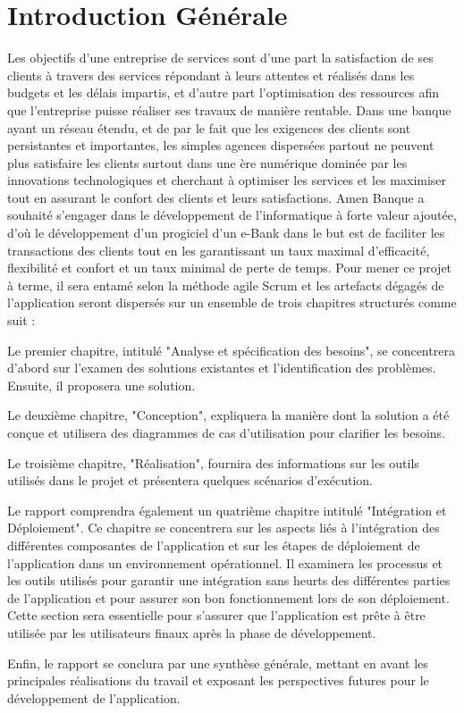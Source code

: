 \chapter*{Introduction Générale}

{\huge L}es objectifs d’une entreprise de services sont d’une part la satisfaction de ses clients à travers des services répondant à leurs attentes et réalisés dans les budgets et les délais impartis, et d’autre part l’optimisation des ressources afin que l’entreprise puisse réaliser ses travaux de manière rentable. Dans une banque ayant un réseau étendu, et de par le fait que les exigences des clients sont persistantes et importantes, les simples agences dispersées partout ne peuvent plus satisfaire les clients surtout dans une ère numérique dominée par les innovations technologiques et cherchant à optimiser les services et les maximiser tout en assurant le confort des clients et leurs satisfactions. 
Amen Banque a souhaité s'engager dans le développement de l'informatique à forte valeur ajoutée, d'où le développement d'un progiciel d’un e-Bank dans le but est de faciliter les transactions des clients tout en les garantissant un taux maximal d’efficacité, flexibilité et confort et un taux minimal de perte de temps.
Pour mener ce projet à terme, il sera entamé selon la méthode agile Scrum et les artefacts dégagés de l’application seront dispersés sur un ensemble de trois chapitres structurés comme suit : 

Le premier chapitre, intitulé "Analyse et spécification des besoins", se concentrera d'abord sur l'examen des solutions existantes et l'identification des problèmes. Ensuite, il proposera une solution.

Le deuxième chapitre, "Conception", expliquera la manière dont la solution a été conçue et utilisera des diagrammes de cas d'utilisation pour clarifier les besoins.

Le troisième chapitre, "Réalisation", fournira des informations sur les outils utilisés dans le projet et présentera quelques scénarios d'exécution.

Le rapport comprendra également un quatrième chapitre intitulé "Intégration et Déploiement". Ce chapitre se concentrera sur les aspects liés à l'intégration des différentes composantes de l'application et sur les étapes de déploiement de l'application dans un environnement opérationnel. Il examinera les processus et les outils utilisés pour garantir une intégration sans heurts des différentes parties de l'application et pour assurer son bon fonctionnement lors de son déploiement. Cette section sera essentielle pour s'assurer que l'application est prête à être utilisée par les utilisateurs finaux après la phase de développement.

Enfin, le rapport se conclura par une synthèse générale, mettant en avant les principales réalisations du travail et exposant les perspectives futures pour le développement de l'application.
